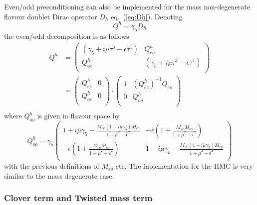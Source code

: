 Even/odd preconditioning can also be implemented for the mass
non-degenerate flavour doublet Dirac operator $D_h$
eq.~(\ref{eq:Dh}). Denoting 
\[
Q^h = \gamma_5 D_h
\]
the even/odd decomposition is as follows
\begin{equation}
  \label{eq:Dheo}
  \begin{split}
    Q^h &=
    \begin{pmatrix}
      (\gamma_5+i\bar\mu\tau^3 -\bar\epsilon\tau^1) & Q^h_{eo}\\
      Q^h_{oe} & (\gamma_5+i\bar\mu\tau^3 -\bar\epsilon\tau^1)\\
    \end{pmatrix} \\
    &=
    \begin{pmatrix}
      Q^h_{ee} & 0 \\
      Q^h_{oe} & 0 \\
    \end{pmatrix}
    \cdot
    \begin{pmatrix}
      1 & (Q^h_{ee})^{-1}Q_{eo} \\
      0 & Q^h_{oo} \\
    \end{pmatrix} \\
  \end{split}
\end{equation}
where $Q^h_{oo}$ is given in flavour space by
\begin{equation*}
  Q^h_{oo} = \gamma_5
  \begin{pmatrix}
    1 + i\bar\mu\gamma_5 -
    \frac{M_{oe}(1-i\bar\mu\gamma_5)M_{eo}}{1+\bar\mu^2-\bar\epsilon^2} & 
    -\bar\epsilon\left(1+\frac{M_{oe}M_{eo}}{1+\bar\mu^2-\bar\epsilon^2}\right) \\
    -\bar\epsilon\left(1+\frac{M_{oe}M_{eo}}{1+\bar\mu^2-\bar\epsilon^2}\right) & 
    1 - i\bar\mu\gamma_5 -
    \frac{M_{oe}(1-i\bar\mu\gamma_5)M_{eo}}{1+\bar\mu^2-\bar\epsilon^2}\\
  \end{pmatrix}
\end{equation*}
with the previous definitions of $M_{eo}$ etc. The inplementation for
the HMC is very similar to the mass degenerate case.

\subsubsection{Clover term and Twisted mass term}


